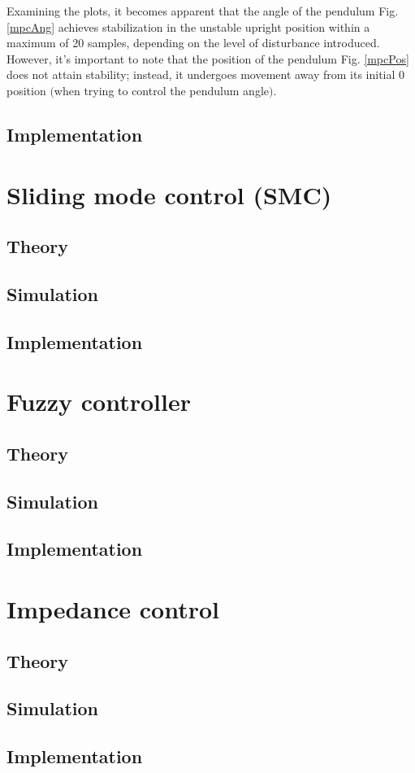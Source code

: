 Examining the plots, it becomes apparent that the angle of the pendulum Fig. \ref{mpcAng} achieves stabilization in the unstable upright position within a maximum of 20 samples, depending on the level of disturbance introduced. However, it's important to note that the position of the pendulum Fig. \ref{mpcPos} does not attain stability; instead, it undergoes movement away from its initial 0 position $($when trying to control the pendulum angle$)$.

\subsection{Implementation}

\newpage
\section{Sliding mode control (SMC)}
\subsection{Theory}
\subsection{Simulation}
\subsection{Implementation}

\newpage
\section{Fuzzy controller}
\subsection{Theory}
\subsection{Simulation}
\subsection{Implementation}

\newpage
\section{Impedance control}
\subsection{Theory}
\subsection{Simulation}
\subsection{Implementation}